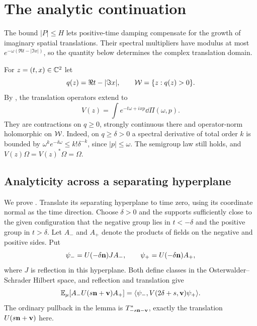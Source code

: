\section{The analytic continuation}\label{sec:analytic}

The bound $|P|\leq H$ lets positive-time damping compensate for the
growth of imaginary spatial translations. Their spectral multipliers
have modulus at most $e^{-\omega(\Re t-|\Im x|)}$, so the quantity
below determines the complex translation domain.

For $z=(t,x)\in\mathbb{C}^2$ let
\begin{equation}\label{eq:tube}
 q(z)=\Re t-|\Im x|,\qquad\mathcal{W}=\{z:q(z)>0\}.
\end{equation}
By , the translation operators extend to
\begin{equation}\label{eq:complex-translations}
 V(z)=\int e^{-t\omega+ixp}\dd\Pi(\omega,p).
\end{equation}
They are contractions on $q\geq0$, strongly continuous there and
operator-norm holomorphic on $\mathcal{W}$. Indeed, on $q\geq\delta>0$ a
spectral derivative of total order $k$ is bounded by
$\omega^ke^{-\delta\omega}\leq k!\delta^{-k}$, since $|p|\leq\omega$.
The semigroup law still holds, and $V(z)\Omega=V(z)^*\Omega=\Omega$.

\subsection{Analyticity across a separating hyperplane}
\label{subsec:cluster-analyticity}

We prove . Translate its separating hyperplane
to time zero, using its coordinate normal as the time direction.
Choose $\delta>0$ and the supports sufficiently close to the given
configuration that the negative group lies in $t<-\delta$ and the
positive group in $t>\delta$. Let $A_-$ and
$A_+$ denote the products of fields on the negative and positive
sides. Put
\begin{equation}
 \psi_-=U(-\delta\mathbf{n})J A_-,\qquad
 \psi_+=U(-\delta\mathbf{n})A_+,
\end{equation}
where $J$ is reflection in this hyperplane. Both define classes in
the Osterwalder--Schrader Hilbert space, and reflection and translation give
\begin{equation}\label{eq:cluster-matrix-element}
 \mathbb{E}_\mu[A_-U(s\mathbf{n}+\mathbf{v})A_+]
   =\langle\psi_-,V(2\delta+s,\mathbf{v})\psi_+\rangle.
\end{equation}
The ordinary pullback in the lemma is
$T_{-s\mathbf{n}-\mathbf{v}}^*$, exactly the translation $U(s\mathbf{n}+\mathbf{v})$ here.

